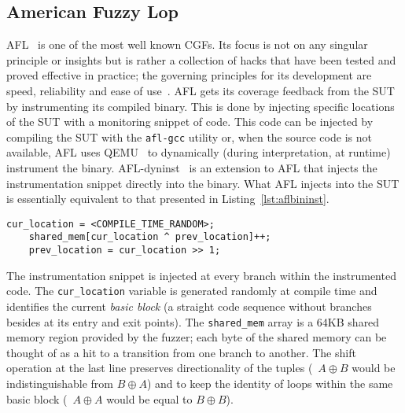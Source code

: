 \subsection{American Fuzzy Lop}
AFL~\cite{afl} is one of the most well known \acp{CGF}. Its focus is not on any
singular principle or insights but is rather a collection of hacks that have
been tested and proved effective in practice; the governing principles for its
development are speed, reliability and ease of use~\cite{afltech}. AFL gets its
coverage feedback from the \ac{SUT} by instrumenting its compiled binary. This
is done by injecting specific locations of the \ac{SUT} with a monitoring
snippet of code. This code can be injected by compiling the \ac{SUT} with the
\texttt{afl-gcc} utility or, when the source code is not available, AFL uses
QEMU~\cite{bellard2005qemu} to dynamically (during interpretation, at runtime)
instrument the binary. AFL-dyninst~\cite{afldyn} is an extension to AFL that
injects the instrumentation snippet directly into the binary. What AFL injects
into the \ac{SUT} is essentially equivalent to that presented in
Listing~\ref{lst:aflbininst}.

\begin{lstlisting}[caption={AFL's instrumentation},label=lst:aflbininst,float]
    cur_location = <COMPILE_TIME_RANDOM>;
    shared_mem[cur_location ^ prev_location]++;
    prev_location = cur_location >> 1;
\end{lstlisting}

The instrumentation snippet is injected at every branch within the instrumented
code. The \texttt{cur\_location} variable is generated randomly at compile time
and identifies the current \emph{basic block} (a straight code sequence without
branches besides at its entry and exit points). The \texttt{shared\_mem} array
is a 64KB shared memory region provided by the fuzzer; each byte of the shared
memory can be thought of as a hit to a transition from one branch to another.
The shift operation at the last line preserves directionality of the tuples
(\eg~$A \oplus B$ would be indistinguishable from $B \oplus A$) and to keep the
identity of loops within the same basic block (\eg~$A \oplus A$ would be equal
to $B \oplus B$).

